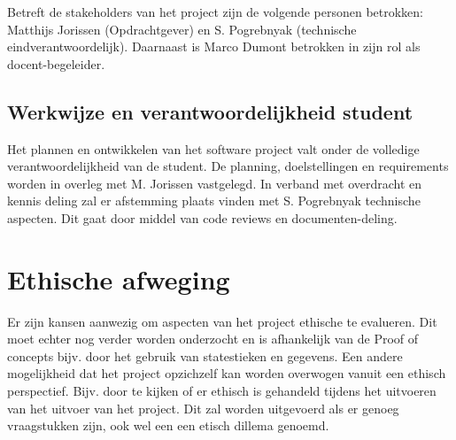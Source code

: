     Betreft de stakeholders van het project zijn de volgende personen betrokken: Matthijs Jorissen (Opdrachtgever) en  S. Pogrebnyak (technische eindverantwoordelijk). Daarnaast is Marco Dumont betrokken in zijn rol als docent-begeleider.

    \subsection{Werkwijze en verantwoordelijkheid student}

    Het plannen en ontwikkelen van het software project valt onder de volledige verantwoordelijkheid van de student. De planning, doelstellingen en requirements worden in overleg met M. Jorissen vastgelegd. In verband met overdracht en kennis deling zal er afstemming plaats vinden met S. Pogrebnyak technische aspecten. Dit gaat door middel van code reviews en documenten-deling.

\section{Ethische afweging} %

Er zijn kansen aanwezig om aspecten van het project ethische te evalueren. Dit moet echter nog verder worden onderzocht en is afhankelijk van de Proof of concepts bijv. door het gebruik van statestieken en gegevens. Een andere mogelijkheid dat het project opzichzelf kan worden overwogen vanuit een ethisch perspectief. Bijv. door te kijken of er ethisch is gehandeld tijdens het uitvoeren van het uitvoer van het project. Dit zal worden uitgevoerd als er genoeg vraagstukken zijn, ook wel een een etisch dillema genoemd.